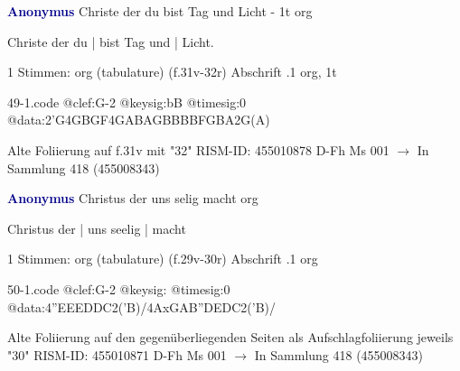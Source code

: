 \documentclass[twocolumn]{book}
\begin{document}
\newline \par \vspace{7pt} \textcolor{darkblue}{\textbf{Anonymus  }}
\newline Christe der du bist Tag und Licht - 1t
\newline org
\newline \begin{itshape}[f.31v, at left:] Christe der du | bist Tag und | Licht.\end{itshape} 
\newline \textcolor{darkblue}{}  1 Stimmen: org (tabulature)  (f.31v-32r)
\newline Abschrift
.1  org, 1t  
\begin{filecontents*}{49-1.code}
@clef:G-2
@keysig:bB
@timesig:0
@data:2'G4GBGF4GABAGBBBBFGBA2G(A)
\end{filecontents*}
\newline
%
\newline Alte Foliierung auf f.31v mit "32"
\newline RISM-ID: 455010878
\newline D-Fh  Ms 001
\newline $\rightarrow$ In Sammlung 418 (455008343)
      
\newline \par \vspace{7pt} \textcolor{darkblue}{\textbf{Anonymus  }}
\newline Christus der uns selig macht
\newline org
\newline \begin{itshape}[f.29v, at left:] Christus der | uns seelig | macht\end{itshape} 
\newline \textcolor{darkblue}{}  1 Stimmen: org (tabulature)  (f.29v-30r)
\newline Abschrift
.1  org  
\begin{filecontents*}{50-1.code}
@clef:G-2
@keysig:
@timesig:0
@data:4''EEEDDC2('B)/4AxGAB''DEDC2('B)/
\end{filecontents*}
\newline
%
\newline Alte Foliierung auf den gegenüberliegenden Seiten als Aufschlagfoliierung jeweils "30"
\newline RISM-ID: 455010871
\newline D-Fh  Ms 001
\newline $\rightarrow$ In Sammlung 418 (455008343)
      
\end{document}
